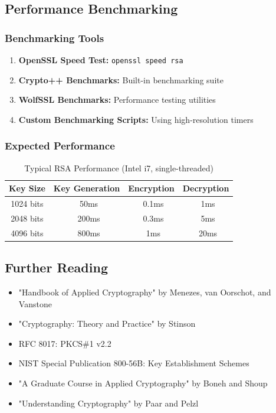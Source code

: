 \documentclass[11pt,a4paper]{article}
\begin{document}
\subsection{Performance Benchmarking}

\subsubsection{Benchmarking Tools}

\begin{enumerate}
    \item \textbf{OpenSSL Speed Test:} \texttt{openssl speed rsa}
    
    \item \textbf{Crypto++ Benchmarks:} Built-in benchmarking suite
    
    \item \textbf{WolfSSL Benchmarks:} Performance testing utilities
    
    \item \textbf{Custom Benchmarking Scripts:} Using high-resolution timers
\end{enumerate}

\subsubsection{Expected Performance}

\begin{table}[h]
\centering
\begin{tabular}{|c|c|c|c|}
\hline
\textbf{Key Size} & \textbf{Key Generation} & \textbf{Encryption} & \textbf{Decryption} \\
\hline
1024 bits & ~50ms & ~0.1ms & ~1ms \\
2048 bits & ~200ms & ~0.3ms & ~5ms \\
4096 bits & ~800ms & ~1ms & ~20ms \\
\hline
\end{tabular}
\caption{Typical RSA Performance (Intel i7, single-threaded)}
\end{table}

\subsection{Further Reading}

\begin{itemize}
    \item "Handbook of Applied Cryptography" by Menezes, van Oorschot, and Vanstone
    \item "Cryptography: Theory and Practice" by Stinson
    \item RFC 8017: PKCS\#1 v2.2
    \item NIST Special Publication 800-56B: Key Establishment Schemes
    \item "A Graduate Course in Applied Cryptography" by Boneh and Shoup
    \item "Understanding Cryptography" by Paar and Pelzl
\end{itemize}
\end{document}
